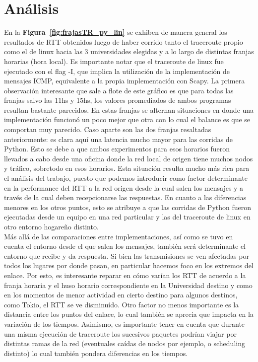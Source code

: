 \section{Análisis}

En la \textbf{Figura~\ref{fig:frajasTR_py_lin}} se exhiben de manera general los resultados de RTT obtenidos luego de haber corrido tanto el traceroute propio como el de linux hacia las 3 universidades elegidas y a lo largo de distintas franjas horarias (hora local). Es importante notar que el traceroute de linux fue ejecutado con el flag -I, que implica la utilización de la implementación de mensajes ICMP, equivalente a la propia implementación con Scapy. La primera observación interesante que sale a flote de este gráfico es que para todas las franjas salvo las 11hs y 15hs, los valores promediados de ambos programas resultan bastante parecidos. En estas franjas se alternan situaciones en donde una implementación funcionó un poco mejor que otra con lo cual el balance es que se comportan muy parecido. Caso aparte son las dos franjas resaltadas anteriormente: es clara aquí una latencia mucho mayor para las corridas de Python. Esto se debe a que ambos experimentos para esos horarios fueron llevados a cabo desde una oficina donde la red local de origen tiene muchos nodos y tráfico, sobretodo en esos horarios. Esta situación resulta mucho más rica para el análisis del trabajo, puesto que podemos introducir como factor determinante en la performance del RTT a la red origen desde la cual salen los mensajes y a través de la cual deben recepcionarse las respuestas. En cuanto a las diferencias menores en los otros puntos, esto se atribuye a que las corridas de Python fueron ejecutadas desde un equipo en una red particular y las del traceroute de linux en otro entorno hogareño distinto.\\
\indent Más allá de las comparaciones entre implementaciones, así como se tuvo en cuenta el entorno desde el que salen los mensajes, también será determinante el entorno que recibe y da respuesta. Si bien las transmisiones se ven afectadas por todos los lugares por donde pasan, en particular hacemos foco en los extremos del enlace. Por esto, es interesante reparar en cómo varían los RTT de acuerdo a la franja horaria y el huso horario correspondiente en la Universidad destino y como en los momentos de menor actividad en cierto destino para algunos destinos, como Tokio, el RTT se ve disminuído. Otro factor no menos importante es la distancia entre los puntos del enlace, lo cual también se aprecia que impacta en la variación de los tiempos. Asimismo, es importante tener en cuenta que durante una misma ejecución de traceroute los sucesivos paquetes podrían viajar por distintas ramas de la red (eventuales caídas de nodos por ejemplo, o scheduling distinto) lo cual también pondera diferencias en los tiempos.\\
